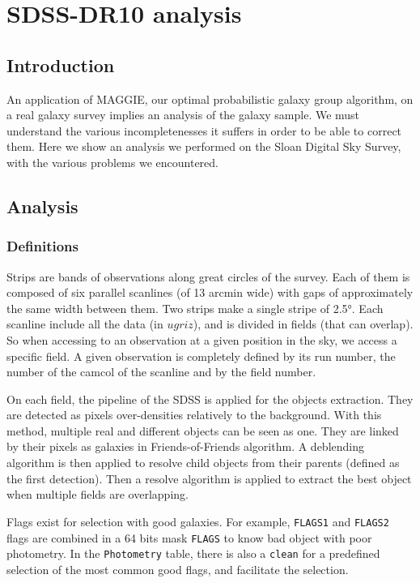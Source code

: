 \chapter{SDSS-DR10 analysis}
\label{cha:sdss}
\minitoc%

\section{Introduction}

An application of MAGGIE, our optimal probabilistic galaxy group algorithm, on
a real galaxy survey implies an analysis of the galaxy sample. We must
understand the various incompletenesses it suffers in order to be able to
correct them. Here we show an analysis we performed on the Sloan Digital Sky
Survey, with the various problems we encountered.

\section{Analysis}

\subsection{Definitions}

Strips are bands of observations along great circles of the survey. Each of
them is composed of six parallel scanlines (of 13 arcmin wide) with gaps of
approximately the same width between them. Two strips make a single stripe
of 2.5°. Each scanline include all the data (in $ugriz$), and is divided in
fields (that can overlap). So when accessing to an observation at a given
position in the sky, we access a specific field. A given observation is
completely defined by its run number, the number of the camcol of the
scanline and by the field number.

On each field, the pipeline of the SDSS is applied for the objects
extraction. They are detected as pixels over-densities relatively to the
background. With this method, multiple real and different objects can be
seen as one. They are linked by their pixels as galaxies in
Friends-of-Friends algorithm. A deblending algorithm is then applied to
resolve child objects from their parents (defined as the first detection).
Then a resolve algorithm is applied to extract the best object when multiple
fields are overlapping.

Flags exist for selection with good galaxies. For example, \texttt{FLAGS1}
and \texttt{FLAGS2} flags are combined in a 64 bits mask \texttt{FLAGS} to
know bad object with poor photometry. In the \texttt{Photometry} table,
there is also a \texttt{clean} for a predefined selection of the most common
good flags, and facilitate the selection.


